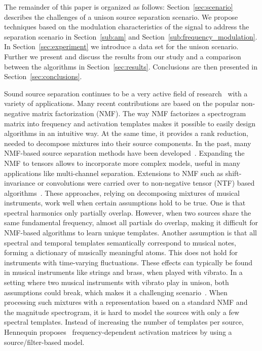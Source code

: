 The remainder of this paper is organized as follows: Section~\ref{sec:scenario} describes the challenges of a unison source separation scenario. We propose techniques based on the modulation characteristics of the signal to address the separation scenario in Section~\ref{sub:am} and Section~\ref{sub:frequency_modulation}. In Section~\ref{sec:experiment} we introduce a data set for the unison scenario. Further we present and discuss the results from our study and a comparison between the algorithms in Section~\ref{sec:results}. Conclusions are then presented in Section~\ref{sec:conclusions}.



Sound source separation continues to be a very active field of research~\cite{vincentSSoverview2014} with a variety of applications. Many recent contributions are based on the popular non-negative matrix factorization (NMF). The way NMF factorizes a spectrogram matrix into frequency and activation templates makes it possible to easily design algorithms in an intuitive way. At the same time, it provides a rank reduction, needed to decompose mixtures into their source components.
In the past, many NMF-based source separation methods have been developed~\cite{smaragdis2003nmf, NMFD-Smaragdis04, virtanen2007monaural}. Expanding the NMF to tensors allows to incorporate more complex models, useful in many applications like multi-channel separation. Extensions to NMF such as shift-invariance or convolutions were carried over to non-negative tensor (NTF) based algorithms~\cite{fitzgerald2005non, fitzgerald2008extended, Fitzgerald06soundsource, fevotte_cmmr10, Ozerov2011}. These approaches, relying on decomposing mixtures of musical instruments, work well when certain assumptions hold to be true.
One is that spectral harmonics only partially overlap. However, when two sources share the same fundamental frequency, almost all partials do overlap, making it difficult for NMF-based algorithms to learn unique templates. Another assumption is that all spectral and temporal templates semantically correspond to musical notes, forming a dictionary of musically meaningful atoms.
This does not hold for instruments with time-varying fluctuations. These effects can typically be found in musical instruments like strings and brass, when played with vibrato. In a setting where two musical instruments with vibrato play in unison, both assumptions could break, which makes it a challenging scenario~\cite{stoeter2014}.
When processing such mixtures with a representation based on a standard NMF and the magnitude spectrogram, it is hard to model the sources with only a few spectral templates. Instead of increasing the number of templates per source, Hennequin proposes~\cite{hennequin2011nmf} frequency-dependent activation matrices by using a source/filter-based model.

